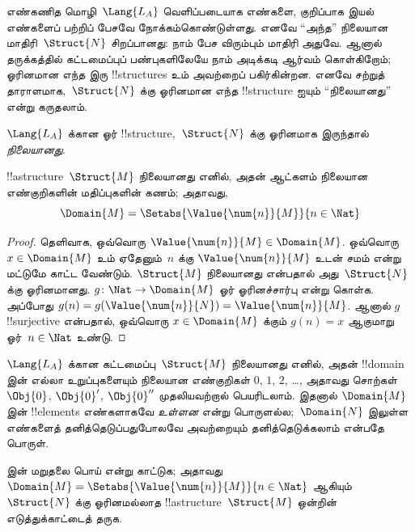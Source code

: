 \documentclass[../../../include/open-logic-section]{subfiles}
\begin{document}


எண்கணித மொழி~$\Lang{L_A}$ வெளிப்படையாக எண்களை, குறிப்பாக இயல்
எண்களைப் பற்றிப் பேசவே நோக்கம்கொண்டுள்ளது. எனவே ``அந்த'' நிலையான
மாதிரி~$\Struct{N}$ சிறப்பானது: நாம் பேச விரும்பும் மாதிரி அதுவே.
ஆனால் தருக்கத்தில் கட்டமைப்புப் பண்புகளிலேயே நாம் அடிக்கடி ஆர்வம்
கொள்கிறோம்; ஓரினமான எந்த இரு !!{structure}s உம் அவற்றைப் பகிர்கின்றன.
எனவே சற்றுத் தாராளமாக,~$\Struct{N}$ க்கு ஓரினமான எந்த
!!{structure} ஐயும் ``நிலையானது'' என்று கருதலாம்.

\begin{defn}
$\Lang{L_A}$ க்கான ஓர் !!{structure},~$\Struct{N}$ க்கு ஓரினமாக
இருந்தால் \emph{நிலையானது}.
\end{defn}

\begin{prop}
 !!a{structure}~$\Struct{M}$ நிலையானது
எனில், அதன் ஆட்களம் நிலையான எண்குறிகளின் மதிப்புகளின் கணம்; அதாவது,
\[
\Domain{M} = \Setabs{\Value{\num{n}}{M}}{n \in \Nat}
\]
\end{prop}

\begin{proof}
தெளிவாக, ஒவ்வொரு $\Value{\num{n}}{M} \in \Domain{M}$. ஒவ்வொரு
$x \in \Domain{M}$ உம் ஏதேனும்~$n$ க்கு
$\Value{\num{n}}{M}$ உடன் சமம் என்று மட்டுமே காட்ட வேண்டும்.
$\Struct{M}$ நிலையானது என்பதால் அது~$\Struct{N}$ க்கு ஓரினமானது.
$g\colon \Nat \to \Domain{M}$ ஓர் ஓரினச்சார்பு என்று கொள்க. அப்போது
$g(n) = g(\Value{\num{n}}{N}) =
\Value{\num{n}}{M}$. ஆனால் $g$ !!{surjective} என்பதால், ஒவ்வொரு
$x \in \Domain{M}$ க்கும் $g(n) = x$ ஆகுமாறு ஓர்~$n
\in \Nat$ உண்டு.
\end{proof}

\begin{explain}
$\Lang{L_A}$ க்கான கட்டமைப்பு~$\Struct{M}$ நிலையானது எனில், அதன்
!!{domain} இன் எல்லா உறுப்புகளையும் நிலையான எண்குறிகள் $\num{0}$,
$\num{1}$, $\num{2}$, \dots, அதாவது சொற்கள் $\Obj{0}$, $\Obj{0}'$,
$\Obj{0}''$ முதலியவற்றால் பெயரிடலாம். இதனால் $\Domain{M}$ இன்
!!{element}s எண்களாகவே \emph{உள்ளன} என்று பொருளல்ல;~$\Domain{N}$
இலுள்ள எண்களைத் தனித்தெடுப்பதுபோலவே அவற்றையும் தனித்தெடுக்கலாம்
என்பதே பொருள்.
\end{explain}

\begin{prob}
 இன் மறுதலை பொய் என்று
காட்டுக; அதாவது $\Domain{M} =
\Setabs{\Value{\num{n}}{M}}{n \in \Nat}$ ஆகியும்~$\Struct{N}$ க்கு
ஓரினமல்லாத !!a{structure}~$\Struct{M}$ ஒன்றின் எடுத்துக்காட்டைத் தருக.
\end{prob}
\end{document}
